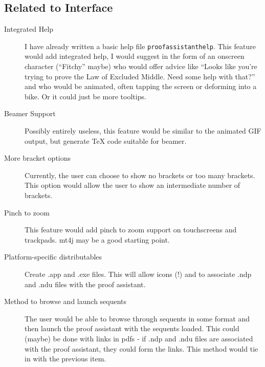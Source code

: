 \documentclass[a4paper]{article}
\begin{document}
\subsection{Related to Interface}
\begin{description}
	\item[Integrated Help] I have already written a basic help file \texttt{proofassistanthelp}. This feature would add integrated help, I would suggest in the form of an onscreen character (``Fitchy'' maybe) who would offer advice like ``Looks like you're trying to prove the Law of Excluded Middle. Need some help with that?'' and who would be animated, often tapping the screen or deforming into a bike. Or it could just be more tooltips.
	\item[Beamer Support] Possibly entirely useless, this feature would be similar to the animated GIF output, but generate {\TeX} code suitable for beamer.
	\item[More bracket options] Currently, the user can choose to show no brackets or too many brackets. This option would allow the user to show an intermediate number of brackets.
	\item[Pinch to zoom] This feature would add pinch to zoom support on touchscreens and trackpads. mt4j may be a good starting point.
	\item[Platform-specific distributables] Create .app and .exe files. This will allow icons (!) and to associate .ndp and .ndu files with the proof assistant.
	\item[Method to browse and launch sequents] The user would be able to browse through sequents in some format and then launch the proof assistant with the sequents loaded. This could (maybe) be done with links in pdfs - if .ndp and .ndu files are associated with the proof assistant, they could form the links. This method would tie in with the previous item.
\end{description}
\end{document}
